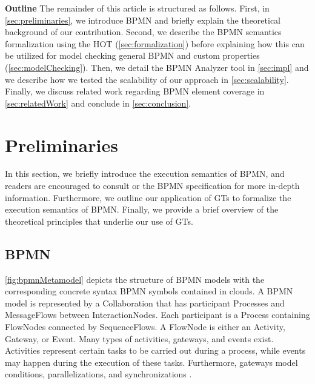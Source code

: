 \documentclass{lmcs} %
\begin{document}
\textbf{Outline} The remainder of this article is structured as follows.
First, in \autoref{sec:preliminaries}, we introduce BPMN and briefly explain the theoretical background of our contribution.
Second, we describe the BPMN semantics formalization using the HOT (\autoref{sec:formalization}) before explaining how this can be utilized for model checking general BPMN and custom properties (\autoref{sec:modelChecking}).
Then, we detail the BPMN Analyzer tool in \autoref{sec:impl} and we describe how we tested the scalability of our approach in \autoref{sec:scalability}.
Finally, we discuss related work regarding BPMN element coverage in \autoref{sec:relatedWork} and conclude in \autoref{sec:conclusion}.






\section{Preliminaries} \label{sec:preliminaries}

In this section, we briefly introduce the execution semantics of BPMN, and readers are encouraged to consult \cite{freundRealLifeBPMNUsing2019} or the BPMN specification \cite{objectmanagementgroupBusinessProcessModel2013} for more in-depth information. 
Furthermore, we outline our application of GTs to formalize the execution semantics of BPMN.
Finally, we provide a brief overview of the theoretical principles that underlie our use of GTs.


\subsection{BPMN}
\autoref{fig:bpmnMetamodel} depicts the structure of BPMN models with the corresponding concrete syntax BPMN symbols contained in clouds.
A BPMN model is represented by a \textsf{Collaboration} that has participant \textsf{Process}es and \textsf{MessageFlow}s between \textsf{InteractionNode}s.
Each participant is a \textsf{Process} containing \textsf{FlowNode}s connected by \textsf{SequenceFlow}s.
A \textsf{FlowNode} is either an \textsf{Activity}, \textsf{Gateway}, or \textsf{Event}.
Many types of activities, gateways, and events exist. %
Activities represent certain tasks to be carried out during a process, while events may happen during the execution of these tasks.
Furthermore, gateways model conditions, parallelizations, and synchronizations \cite{freundRealLifeBPMNUsing2019}.
\end{document}
